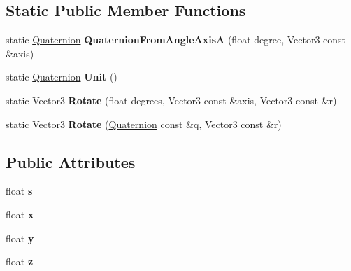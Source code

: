 \subsection*{Static Public Member Functions}
\begin{DoxyCompactItemize}
\item 
\mbox{\label{structMathUtil_1_1Quaternion_a63ef2f087b43c15a16f685d2a58aa25e}} 
static \hyperlink{structMathUtil_1_1Quaternion}{Quaternion} {\bfseries Quaternion\+From\+Angle\+AxisA} (float degree, Vector3 const \&axis)
\item 
\mbox{\label{structMathUtil_1_1Quaternion_ae3460ce6b0259b013efb199bc5da32c9}} 
static \hyperlink{structMathUtil_1_1Quaternion}{Quaternion} {\bfseries Unit} ()
\item 
\mbox{\label{structMathUtil_1_1Quaternion_abbc1484b797a8677a99cbe9c3947f7a9}} 
static Vector3 {\bfseries Rotate} (float degrees, Vector3 const \&axis, Vector3 const \&r)
\item 
\mbox{\label{structMathUtil_1_1Quaternion_a0e7a75c2d2655616ddd505d0abfecb01}} 
static Vector3 {\bfseries Rotate} (\hyperlink{structMathUtil_1_1Quaternion}{Quaternion} const \&q, Vector3 const \&r)
\end{DoxyCompactItemize}
\subsection*{Public Attributes}
\begin{DoxyCompactItemize}
\item 
\mbox{\label{structMathUtil_1_1Quaternion_ab31b359cfe29936ec4572e83aee9c9d4}} 
float {\bfseries s}
\item 
\mbox{\label{structMathUtil_1_1Quaternion_a81f714a042bf08434cfddf71ae83ff6b}} 
float {\bfseries x}
\item 
\mbox{\label{structMathUtil_1_1Quaternion_af5e221df6b1d0673a76c5079dcd74a24}} 
float {\bfseries y}
\item 
\mbox{\label{structMathUtil_1_1Quaternion_a2581fc91bb0438871f5e6eed0e34cd94}} 
float {\bfseries z}
\end{DoxyCompactItemize}
